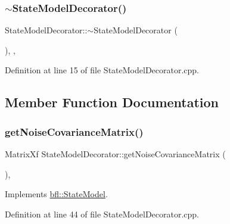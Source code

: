 \subsubsection{\texorpdfstring{$\sim$\+State\+Model\+Decorator()}{~StateModelDecorator()}}
{\footnotesize\ttfamily State\+Model\+Decorator\+::$\sim$\+State\+Model\+Decorator (\begin{DoxyParamCaption}{ }\end{DoxyParamCaption})\hspace{0.3cm}{\ttfamily [protected]}, {\ttfamily [virtual]}, {\ttfamily [noexcept]}}



Definition at line 15 of file State\+Model\+Decorator.\+cpp.



\subsection{Member Function Documentation}
\mbox{\label{classbfl_1_1StateModelDecorator_a1c64652f48c9463a2fa9b9e85d5ef0cf}} 
\subsubsection{\texorpdfstring{get\+Noise\+Covariance\+Matrix()}{getNoiseCovarianceMatrix()}}
{\footnotesize\ttfamily Matrix\+Xf State\+Model\+Decorator\+::get\+Noise\+Covariance\+Matrix (\begin{DoxyParamCaption}{ }\end{DoxyParamCaption})\hspace{0.3cm}{\ttfamily [override]}, {\ttfamily [virtual]}}



Implements \mbox{\hyperlink{classbfl_1_1StateModel_a606efee8bf37606833c1ac75f2fbb357}{bfl\+::\+State\+Model}}.



Definition at line 44 of file State\+Model\+Decorator.\+cpp.

\mbox{\label{classbfl_1_1StateModelDecorator_a3e29bad844203ffc3fe0c2bc445377e5}} 
